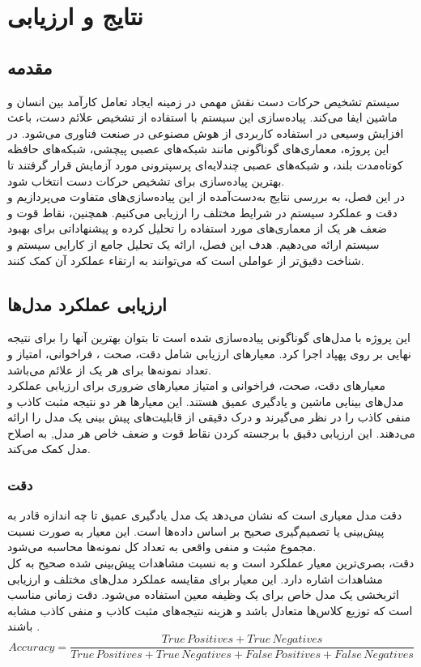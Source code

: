 \chapter{نتایج و ارزیابی}
\section{مقدمه}
سیستم تشخیص حرکات دست نقش مهمی در زمینه ایجاد تعامل کارآمد بین انسان و ماشین ایفا می‌کند. پیاده‌سازی این سیستم با استفاده از تشخیص علائم دست، باعث افزایش وسیعی در استفاده کاربردی از هوش مصنوعی  در صنعت فناوری می‌شود. در این پروژه، 
معماری‌های گوناگونی مانند شبکه‌های عصبی پیچشی، شبکه‌های حافظه کوتاه‌مدت بلند، و شبکه‌های عصبی چندلایه‌ای پرسپترونی مورد آزمایش قرار گرفتند تا بهترین پیاده‌سازی برای تشخیص حرکات دست انتخاب شود. 
\\
در این فصل، به بررسی نتایج به‌دست‌آمده از این پیاده‌سازی‌های متفاوت می‌پردازیم و دقت و عملکرد سیستم در شرایط مختلف را ارزیابی می‌کنیم. همچنین، نقاط قوت و ضعف هر یک از معماری‌های مورد استفاده 
را تحلیل کرده و پیشنهاداتی برای بهبود سیستم ارائه می‌دهیم. هدف این فصل، ارائه یک تحلیل جامع از کارایی سیستم و شناخت دقیق‌تر از عواملی است که می‌توانند به ارتقاء عملکرد آن کمک کنند.

\section{ارزیابی عملکرد مدل‌ها}

این پروژه با مدل‌های گوناگونی پیاده‌سازی شده است تا بتوان بهترین آنها را برای نتیجه نهایی بر روی پهپاد اجرا کرد. معیارهای ارزیابی شامل دقت، صحت ، فراخوانی، امتیاز  و
تعداد نمونه‌ها برای هر یک از علائم‌ می‌باشد.
\\
معیار‌های دقت، صحت، فراخوانی و امتیاز  معیارهای ضروری برای ارزیابی عملکرد مدل‌های بینایی ماشین و یادگیری عمیق هستند. این معیار‌ها هر دو نتیجه مثبت کاذب و منفی کاذب را در نظر
می‌گیرند و درک دقیقی از قابلیت‌های پیش بینی یک مدل را ارائه می‌دهند. این ارزیابی دقیق با برجسته کردن نقاط قوت و ضعف خاص هر مدل, به اصلاح مدل کمک می‌کند.
\subsection{دقت}
دقت مدل معیاری است که نشان می‌دهد یک مدل یادگیری عمیق تا چه اندازه قادر به پیش‌بینی یا تصمیم‌گیری صحیح بر اساس داده‌ها است. این معیار به صورت نسبت مجموع مثبت و منفی واقعی به تعداد کل نمونه‌ها محاسبه می‌شود.
\\
دقت، بصری‌ترین معیار عملکرد است و به نسبت مشاهدات پیش‌بینی شده صحیح به کل مشاهدات اشاره دارد. این معیار برای مقایسه عملکرد مدل‌های مختلف و ارزیابی اثربخشی یک مدل خاص برای یک وظیفه معین استفاده می‌شود. دقت زمانی مناسب است که توزیع کلاس‌ها متعادل باشد و هزینه‌ نتیجه‌های مثبت کاذب و منفی کاذب مشابه باشند \cite{Accuracy53:online}.
\begin{equation}
    Accuracy = \frac{True \, Positives + True \, Negatives}{True \, Positives + True \, Negatives + False \, Positives + False \, Negatives}
\end{equation}


